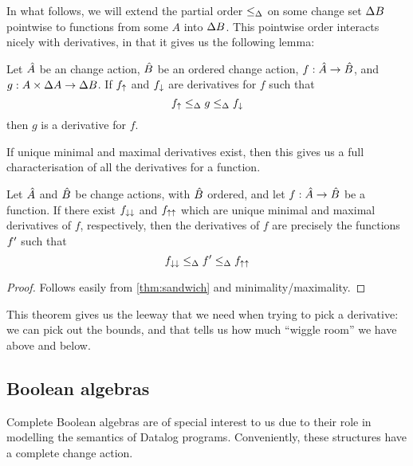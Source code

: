 In what follows, we will extend the partial order $\leq_\Delta$ on some change
set $\Delta B$ pointwise to functions from some $A$ into $\Delta B$. This pointwise
order interacts nicely with derivatives, in that it gives us the following lemma:

\begin{thm}
  \label{thm:sandwich}
  Let $\hat{A}$ be an change action, $\hat{B}$ be an ordered change action,
  $f: \hat{A} \rightarrow \hat{B}$, and $g: A \times \Delta A \rightarrow
  \Delta B$. If $f_\uparrow$ and $f_\downarrow$ are
  derivatives for $f$ such that
  \begin{displaymath}
    f_\uparrow \leq_\Delta g \leq_\Delta f_\downarrow
  \end{displaymath}
  then $g$ is a derivative for $f$.
\end{thm}

If unique minimal and maximal derivatives exist, then this gives us a full
characterisation of all the derivatives for a function.

\begin{thm}
\label{thm:derivativeCharacterization}
  Let $\hat{A}$ and $\hat{B}$ be change actions, with $\hat{B}$ ordered, and let
  $f: \hat{A} \rightarrow \hat{B}$ be a function. If there exist $f_{\downarrow\downarrow}$ and
  $f_{\uparrow\uparrow}$ which are unique minimal and maximal derivatives of $f$,
  respectively, then the derivatives of $f$ are precisely
  the functions $f'$ such that
  \begin{displaymath}
    f_{\downarrow\downarrow} \leq_\Delta f' \leq_\Delta f_{\uparrow\uparrow}
  \end{displaymath}
\end{thm}
\ifproofs
\begin{proof}
  Follows easily from \cref{thm:sandwich} and minimality/maximality.
\end{proof}
\fi

This theorem gives us the leeway that we need when trying to pick a derivative: we can pick out the
bounds, and that tells us how much ``wiggle room'' we have above and below.

\subsection{Boolean algebras}
\label{sec:booleanAlgebras}


Complete Boolean algebras are of special interest to us due to their role in modelling the semantics of
Datalog programs. Conveniently, these structures have a complete change action.

